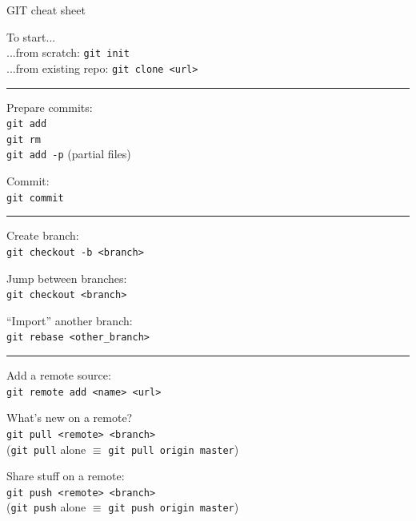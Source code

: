 \documentclass[compress]{beamer}
\begin{document}
\begin{frame}{GIT cheat sheet}
\scriptsize
    \begin{multicols}{2}

    {\Medium To start...}\\
    ...from scratch: \texttt{git init}\\
    ...from existing repo: \texttt{git clone <url>}\par

    \rule{\columnwidth}{0.2pt}

    {\Medium Prepare commits:}\\
    \texttt{git add}\\
    \texttt{git rm}\\
    \texttt{git add -p} (partial files)\par

    {\Medium Commit:}\\
    \texttt{git commit}\par

    \rule{\columnwidth}{0.2pt}

    {\Medium Create branch:}\\
    \texttt{git checkout -b <branch>}\par

    {\Medium Jump between branches:}\\
    \texttt{git checkout <branch>}\par

    {\Medium ``Import'' another branch:}\\
    \texttt{git rebase <other\_branch>}\par

    \rule{\columnwidth}{0.2pt}

    {\Medium Add a remote source:}\\
    \texttt{git remote add <name> <url>}\par

    {\Medium What's new on a remote?}\\
    \texttt{git pull <remote> <branch>}\\
    {\tiny (\texttt{git pull} alone $\equiv$ \texttt{git pull origin master})}\par

    {\Medium Share stuff on a remote:}\\
    \texttt{git push <remote> <branch>}\\
    {\tiny (\texttt{git push} alone $\equiv$ \texttt{git push origin master})}\par


\end{multicols}
\end{frame}
\end{document}
